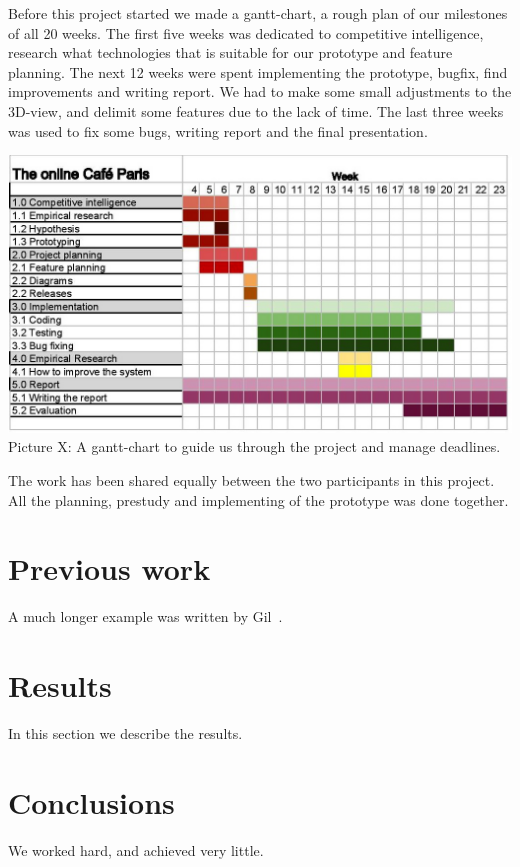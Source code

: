 \documentclass[12pt, titlepage]{article}
\begin{document}
Before this project started we made a gantt-chart, a rough plan of our milestones of all 20 weeks. The first five weeks was dedicated to competitive intelligence, research what technologies that is suitable for our prototype and feature planning. The next 12 weeks were spent implementing the prototype, bugfix, find improvements and writing report. We had to make some small adjustments to the 3D-view, and delimit some features due to the lack of time. The last three weeks was used to fix some bugs, writing report and the final presentation.
\includegraphics{grovplanering.jpg}
Picture X: A gantt-chart to guide us through the project and manage deadlines.

The work has been shared equally between the two participants in this project. All the planning, prestudy and implementing of the prototype was done together. 
\section{Previous work}\label{previous work}
A much longer \LaTeXe{} example was written by Gil~\cite{Gil:02}.

\section{Results}\label{results}
In this section we describe the results.

\section{Conclusions}\label{conclusions}
We worked hard, and achieved very little.



\end{document}
